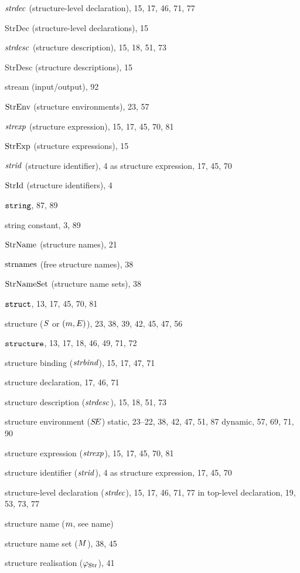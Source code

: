 \begin{theindex}
\item $\strdec$ (structure-level declaration), 15, 17, 46, 71, 77
\item StrDec (structure-level declarations), 15
\item $\strdesc$ (structure description), 15, 18, 51, 73
\item StrDesc (structure descriptions), 15
\item stream (input/output), 92
\item $\StrEnv$ (structure environments), 23, 57
\item $\strexp$ (structure expression), 15, 17, 45, 70, 81
\item $\StrExp$ (structure expressions), 15
\item $\strid$ (structure identifier), 4
\subitem as structure expression, 17, 45, 70
\item $\StrId$ (structure identifiers), 4
\item $\STRING$, 87, 89
\item string constant, 3, 89
\item $\StrNames$ (structure names), 21
\item $\StrNamesFcn$ (free structure names), 38
\item $\StrNameSets$ (structure name sets), 38
\item $\STRUCT$, 13, 17, 45, 70, 81
\item structure ($\S$ or $(\m,\E)$), 23, 38, 39, 42, 45, 47, 56
\item $\STRUCTURE$, 13, 17, 18, 46, 49, 71, 72
\item structure binding ($\strbind$), 15, 17, 47, 71
\item structure declaration, 17, 46, 71
\item structure description ($\strdesc$), 15, 18, 51, 73
\item structure environment ($\SE$) 
\subitem static, 23--22, 38, 42, 47, 51, 87
\subitem dynamic, 57, 69, 71, 90
\item structure expression ($\strexp$), 15, 17, 45, 70, 81
\item structure identifier ($\strid$), 4
\subitem as structure expression, 17, 45, 70
\item structure-level declaration ($\strdec$), 15, 17, 46, 71, 77
\subitem in top-level declaration, 19, 53, 73, 77
\item structure name ($\m$, see name) 
\item structure name set ($\M$), 38, 45
\item structure realisation ($\strrea$), 41

\end{theindex}
